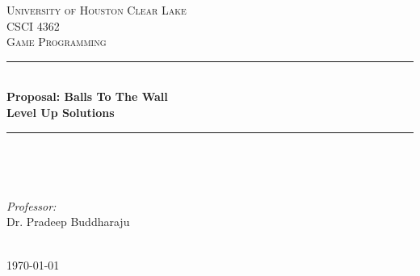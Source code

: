 \documentclass[12pt]{article} %
\begin{document}

\begin{titlepage}

\newcommand{\HRule}{\rule{\linewidth}{0.5mm}} %

\center %

\textsc{\LARGE University of Houston Clear Lake}\\[1.5cm] %
\textsc{\Large CSCI 4362}\\[0.5cm] %
\textsc{\large Game Programming}\\[0.5cm] %

\HRule \\[0.4cm]
{ \huge \bfseries Proposal: Balls To The Wall}\\[0.4cm] %
{ \bfseries Level Up Solutions}\\[0.2cm] %
\HRule \\[1.5cm]

\begin{minipage}{0.4\textwidth}
\begin{flushleft} \large
\emph{Authors:}\\
Mike Moore, \newline
Tom, \newline
Mike} %
\end{flushleft}
\end{minipage}
~
\begin{minipage}{0.4\textwidth}
\begin{flushright} \large
\emph{Professor:} \\
Dr. Pradeep Buddharaju %
\end{flushright}
\end{minipage}\\[4cm]

{\large \today}\\[3cm] %


\vfill %

\end{titlepage}
\end{document}
